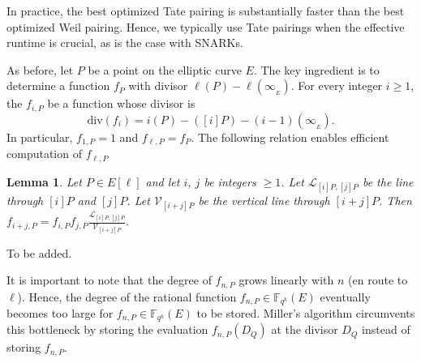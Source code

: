 \documentclass[11pt, lettersize, notitlepage, leqno, footskip=0.6cm]{article}
\newcommand{\bFqk}{\mathbb{F}_{q^k}}
\newcommand{\divv}{\mathrm{div}}
\newcommand{\mc}{\mathcal}
\newcommand{\vs}{\vspace{-2mm}}
\newtheorem{Lem}[Thm]{Lemma}
\numberwithin{equation}{section}
\begin{document}
In practice, the best optimized Tate pairing is substantially faster than the best optimized Weil pairing. Hence, we typically use Tate pairings when the     effective runtime is crucial, as is the case with SNARKs.

As before, let $P$ be a point on the elliptic curve $E$. The key ingredient is to determine a function $f_{P}$ with divisor $\ell(P)-\ell(\infty_{_E})$. For every integer $i\geq 1$, the $f_{i,P}$ be a function whose divisor is \vs $$\divv(f_i) = i(P)	- ([i]P) - (i-1)(\infty_{_E}). $$ In particular, $f_{1,P} = 1$ and $f_{\ell,P} = f_{P}$. The following relation enables efficient computation of $f_{\ell,P}$


\begin{Lem} Let $P\in E[\ell]$ and let $i$, $j$ be integers $\geq 1$. Let $\mc{L}_{[i]P, [j]P}$ be the line through $[i]P$ and $[j]P$. Let $\mc{V}_{[i+j]P}$ be the vertical line through $[i+j]P$. Then $f_{i+j,P} = f_{i,P}f_{j,P}\frac{\mc{L}_{[i]P, [j]P}}{\mc{V}_{[i+j]P}}$.\end{Lem}

\begin{prf} To be added.  \end{prf}

It is important to note that the degree of $f_{n,P}$ grows linearly with $n$ (en route to $\ell$). Hence, the degree of the rational function $f_{n,P}\in \bFqk(E)$ eventually becomes too large for $f_{n,P}\in \bFqk(E)$ to be stored. Miller's algorithm circumvents this bottleneck by storing the evaluation $f_{n,P}(D_Q)$ at the divisor $D_Q$ instead of storing $f_{n,P}$. 



\bigskip
\end{document}
